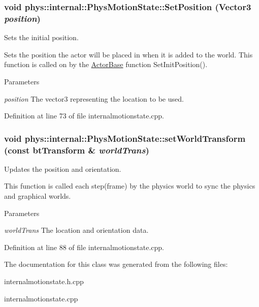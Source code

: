 \hypertarget{classphys_1_1internal_1_1PhysMotionState_ad5c5142565ce4b5cd52d2f377ce4da10}{
\subsubsection[{SetPosition}]{\setlength{\rightskip}{0pt plus 5cm}void phys::internal::PhysMotionState::SetPosition ({\bf Vector3} {\em position})}}
\label{dc/df8/classphys_1_1internal_1_1PhysMotionState_ad5c5142565ce4b5cd52d2f377ce4da10}


Sets the initial position. 

Sets the position the actor will be placed in when it is added to the world. This function is called on by the \hyperlink{classphys_1_1ActorBase}{ActorBase} function SetInitPosition(). 
\begin{DoxyParams}{Parameters}
\item[{\em position}]The vector3 representing the location to be used. \end{DoxyParams}


Definition at line 73 of file internalmotionstate.cpp.

\hypertarget{classphys_1_1internal_1_1PhysMotionState_a1fe29e3e661cdbbfb846fbd0ac91ec37}{
\subsubsection[{setWorldTransform}]{\setlength{\rightskip}{0pt plus 5cm}void phys::internal::PhysMotionState::setWorldTransform (const btTransform \& {\em worldTrans})}}
\label{dc/df8/classphys_1_1internal_1_1PhysMotionState_a1fe29e3e661cdbbfb846fbd0ac91ec37}


Updates the position and orientation. 

This function is called each step(frame) by the physics world to sync the physics and graphical worlds. 
\begin{DoxyParams}{Parameters}
\item[{\em worldTrans}]The location and orientation data. \end{DoxyParams}


Definition at line 88 of file internalmotionstate.cpp.



The documentation for this class was generated from the following files:\begin{DoxyCompactItemize}
\item 
internalmotionstate.h.cpp\item 
internalmotionstate.cpp\end{DoxyCompactItemize}

